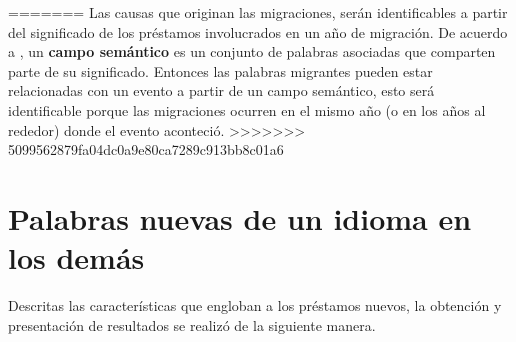 










=======
Las causas que originan las migraciones, serán identificables a partir del
significado de los préstamos involucrados en un año de migración. De acuerdo a
\cite{mcgraw}, un  \textbf{campo semántico} es un conjunto de palabras
asociadas que comparten parte de su significado. Entonces las palabras
migrantes pueden estar relacionadas con un evento a partir de un campo
semántico, esto será identificable porque las migraciones ocurren en el mismo
año (o en los años al rededor) donde el evento aconteció. 
>>>>>>> 5099562879fa04dc0a9e80ca7289c913bb8c01a6

\section{Palabras nuevas de un idioma en los demás} %

Descritas las características que engloban a los préstamos nuevos, la obtención
y presentación de resultados se realizó de la siguiente manera. 


